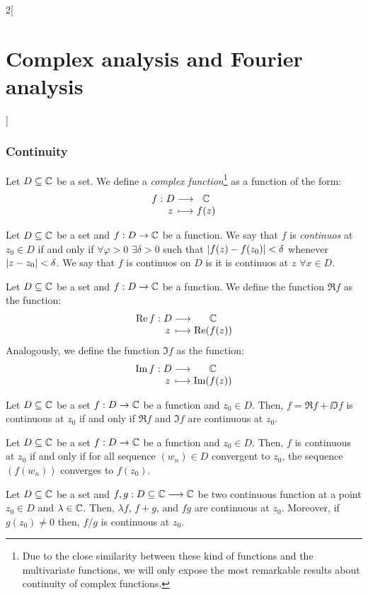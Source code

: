 \documentclass[../../../main.tex]{subfiles}
\begin{document}
\begin{multicols}{2}[\section{Complex analysis and Fourier analysis}]
  \subsubsection{Continuity}
  \begin{definition}
    Let $D \subseteq \mathbb{C}$ be a set. We define a \textit{complex function}\footnote{Due to the close similarity between these kind of functions and the multivariate functions, we will only expose the most remarkable results about continuity of complex functions.} as a function of the form:
    $$\function{f}{D}{\CC}{z}{f(z)}$$
  \end{definition}
  \begin{definition}
    Let $D \subseteq \mathbb{C}$ be a set and $f:D\rightarrow\mathbb{C}$ be a function. We say that $f$ is \emph{continuos} at $z_0\in D$ if and only if $\forall \varphi>0$ $\exists\delta>0$ such that $\abs{f(z)-f(z_0)}<\delta$ whenever $\abs{z-z_0}<\delta$. We say that $f$ is continuos on $D$ is it is continuos at $z$ $\forall x\in D$.
  \end{definition}
  \begin{definition}
    Let $D \subseteq \mathbb{C}$ be a set and $f:D\rightarrow\mathbb{C}$ be a function. We define the function $\Re f$ as the function: $$\function{\Re f}{D}{\CC}{z}{\Re(f(z))}$$
    Analogously, we define the function $\Im f$ as the function: $$\function{\Im f}{D}{\CC}{z}{\Im(f(z))}$$
  \end{definition}
  \begin{proposition}
    Let $D \subseteq \mathbb{C}$ be a set $f:D\rightarrow\mathbb{C}$ be a function and $z_0 \in D$. Then, $f = \Re f + \ii \Im f$ is continuous at $z_0$ if and only if $\Re f$ and $\Im f$ are continuous at $z_0$.
  \end{proposition}
  \begin{proposition}
    Let $D \subseteq \mathbb{C}$ be a set $f:D\rightarrow\mathbb{C}$ be a function and $z_0 \in D$. Then, $f$ is continuous at $z_0$ if and only if for all sequence $(w_n)\in D$ convergent to $z_0$, the sequence $(f(w_n))$ converges to $f(z_0)$.
  \end{proposition}
  \begin{proposition}
    Let $D \subseteq \mathbb{C}$ be a set and $f,g:D \subseteq \mathbb{C} \longrightarrow \mathbb{C}$ be two continuous function at a point $z_0 \in D$ and $\lambda \in \mathbb{C}$. Then, $\lambda f$, $f+g$, and $fg$ are continuous at $z_0$. Moreover, if $g(z_0) \neq 0$ then, $f/g$ is continuous at $z_0$.
  \end{proposition}

\end{multicols}
\end{document}
